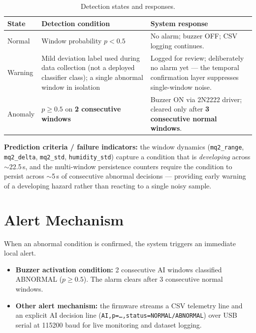 \documentclass[11pt]{article}
\begin{document}
\begin{table}[ht]
\centering
\begin{tabularx}{\textwidth}{l >{\raggedright\arraybackslash}X >{\raggedright\arraybackslash}X}
\toprule
\textbf{State} & \textbf{Detection condition} & \textbf{System response} \\
\midrule
Normal & Window probability $p < 0.5$ &
  No alarm; buzzer OFF; CSV logging continues. \\
Warning & Mild deviation label used during data collection (not a
  deployed classifier class); a single abnormal window in isolation &
  Logged for review; deliberately no alarm yet --- the temporal
  confirmation layer suppresses single-window noise. \\
Anomaly & $p \geq 0.5$ on \textbf{2 consecutive windows} &
  Buzzer ON via 2N2222 driver; cleared only after \textbf{3
  consecutive normal windows}. \\
\bottomrule
\end{tabularx}
\caption{Detection states and responses.}
\end{table}

\textbf{Prediction criteria / failure indicators:} the window dynamics
(\texttt{mq2\_range}, \texttt{mq2\_delta}, \texttt{mq2\_std},
\texttt{humidity\_std}) capture a condition that is \emph{developing}
across $\sim$22.5\,s, and the multi-window persistence counters
require the condition to persist across $\sim$5\,s of consecutive
abnormal decisions --- providing early warning of a developing
hazard rather than reacting to a single noisy sample.

\section{Alert Mechanism}
When an abnormal condition is confirmed, the system triggers an
immediate local alert.

\begin{itemize}[nosep]
  \item \textbf{Buzzer activation condition:} 2 consecutive AI windows
    classified ABNORMAL ($p \geq 0.5$). The alarm clears after 3
    consecutive normal windows.
  \item \textbf{Other alert mechanism:} the firmware streams a CSV
    telemetry line and an explicit AI decision line
    (\texttt{AI,p=\dots,status=NORMAL/ABNORMAL}) over USB serial at
    115200 baud for live monitoring and dataset logging.
\end{itemize}
\end{document}
